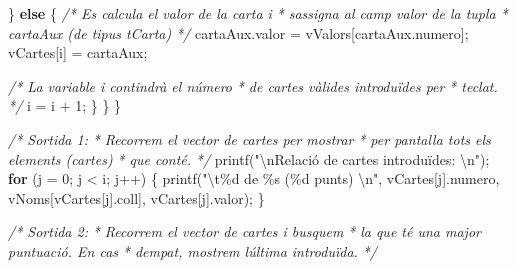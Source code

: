 \documentclass[
]{book}
\newenvironment{Shaded}{\begin{snugshade}}{\end{snugshade}}
\newcommand{\CommentTok}[1]{\textcolor[rgb]{0.56,0.35,0.01}{\textit{#1}}}
\newcommand{\ControlFlowTok}[1]{\textcolor[rgb]{0.13,0.29,0.53}{\textbf{#1}}}
\newcommand{\DecValTok}[1]{\textcolor[rgb]{0.00,0.00,0.81}{#1}}
\newcommand{\NormalTok}[1]{#1}
\newcommand{\SpecialCharTok}[1]{\textcolor[rgb]{0.00,0.00,0.00}{#1}}
\newcommand{\StringTok}[1]{\textcolor[rgb]{0.31,0.60,0.02}{#1}}
\begin{document}
\begin{Shaded}
\begin{Highlighting}[]
\NormalTok{            \} }\ControlFlowTok{else}\NormalTok{ \{}
                \CommentTok{/* Es calcula el valor de la carta i }
\CommentTok{                 * s\textquotesingle{}assigna al camp valor de la tupla}
\CommentTok{                 * cartaAux (de tipus tCarta)}
\CommentTok{                 */}
\NormalTok{                cartaAux.valor = vValors[cartaAux.numero];}
\NormalTok{                vCartes[i] = cartaAux;}
                
                \CommentTok{/* La variable \textquotesingle{}i\textquotesingle{} contindrà el número}
\CommentTok{                 * de cartes vàlides introduïdes per}
\CommentTok{                 * teclat.}
\CommentTok{                 */}
\NormalTok{                i = i + }\DecValTok{1}\NormalTok{;}
\NormalTok{            \}}
\NormalTok{        \}}
\NormalTok{    \}}
    
    \CommentTok{/* Sortida 1:}
\CommentTok{     * Recorrem el vector de cartes per mostrar}
\CommentTok{     * per pantalla tots els elements (cartes)}
\CommentTok{     * que conté.}
\CommentTok{     */}
\NormalTok{    printf(}\StringTok{"}\SpecialCharTok{\textbackslash{}n}\StringTok{Relació de cartes introduïdes: }\SpecialCharTok{\textbackslash{}n}\StringTok{"}\NormalTok{);}
    \ControlFlowTok{for}\NormalTok{ (j = }\DecValTok{0}\NormalTok{; j \textless{} i; j++) \{}
\NormalTok{        printf(}\StringTok{"}\SpecialCharTok{\textbackslash{}t}\StringTok{\%d de \%s (\%d punts) }\SpecialCharTok{\textbackslash{}n}\StringTok{"}\NormalTok{, vCartes[j].numero, vNoms[vCartes[j].coll], vCartes[j].valor);}
\NormalTok{    \}}
    
    \CommentTok{/* Sortida 2:}
\CommentTok{     * Recorrem el vector de cartes i busquem}
\CommentTok{     * la que té una major puntuació. En cas }
\CommentTok{     * d\textquotesingle{}empat, mostrem l\textquotesingle{}última introduïda.}
\CommentTok{     */}


\end{Highlighting}
\end{Shaded}
\end{document}
